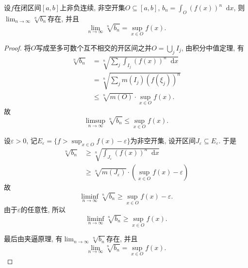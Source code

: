 \documentclass[a4paper,12pt]{ctexart}
\newcommand{\diff}{\mathop{}\!\mathrm{d}}
\newcommand{\E}{E_{\varepsilon}}
\begin{document}
    \begin{lemma}
        设$f$在闭区间$[a,b]$上非负连续, 非空开集$O\subseteq [a,b]$,
        $b_n=\displaystyle \int_O (f(x))^n\diff x$, 则
        $\displaystyle \lim_{n\to\infty}\sqrt[n]{b_n}$存在, 并且
        \begin{equation}
            \lim_{n\to\infty}\sqrt[n]{b_n}=\sup_{x\in O}{f(x)}.
        \end{equation}
    \end{lemma}

    \begin{proof}
        将$O$写成至多可数个互不相交的开区间之并$O=\bigcup_j{I_j}$,
        由积分中值定理, 有
        \begin{equation}
        \begin{aligned}
            \sqrt[n]{b_n}&=\sqrt[n]{\sum_{j}\int_{I_j}{(f(x))^n\diff x}}\\
            &= \sqrt[n]{\sum_{j}m(I_j)(f(\xi_j))^n}\\
            &\leq \sqrt[n]{m(O)}\cdot\sup_{x\in O}{f(x)}.
        \end{aligned}
        \end{equation}
        故
        \begin{equation}
            \limsup_{n\to\infty}{\sqrt[n]{b_n}}\leq\sup_{x\in O}{f(x)}.
        \end{equation}

        设$\varepsilon >0$,
        记$\displaystyle\E=\{f>\sup_{x\in O}{f(x)}-\varepsilon\}$为非空开集,
        设开区间$J_{\varepsilon}\subseteq\E$.
        于是
        \begin{equation}
        \begin{aligned}
            \sqrt[n]{b_n}
            &\geq \sqrt[n]{\int_{J_{\varepsilon}}{(f(x))^n\diff x}}\\
            &\geq \sqrt[n]{m(J_{\varepsilon})}
                \cdot (\sup_{x\in O}{f(x)}-\varepsilon)
        \end{aligned}
        \end{equation}
        故
        \begin{equation}
            \liminf_{n\to\infty}{\sqrt[n]{b_n}}\geq\sup_{x\in O}{f(x)}-\varepsilon.
        \end{equation}
        由于$\varepsilon$的任意性, 所以
        \begin{equation}
            \liminf_{n\to\infty}{\sqrt[n]{b_n}}\geq\sup_{x\in O}{f(x)}.
        \end{equation}
        
        最后由夹逼原理, 有$\displaystyle \lim_{n\to\infty}\sqrt[n]{b_n}$存在, 并且
        \begin{equation}
            \lim_{n\to\infty}\sqrt[n]{b_n}=\sup_{x\in O}{f(x)}.
        \end{equation}
    \end{proof}
\end{document}
